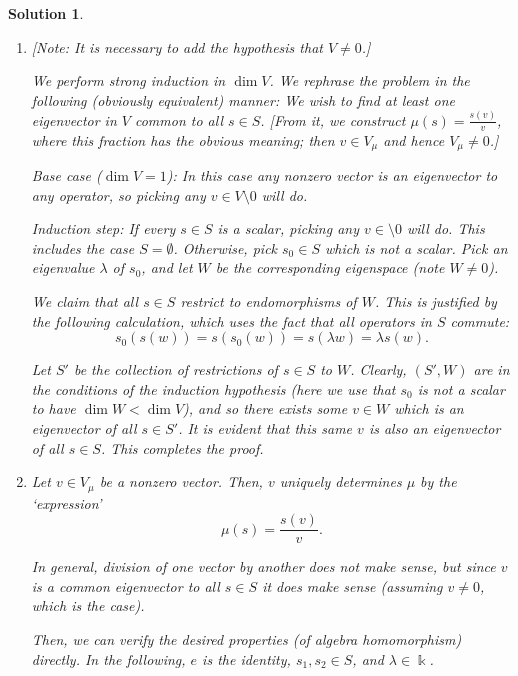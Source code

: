 \documentclass{article}
\theoremstyle{nonumberplain}
\newtheorem{sol}{Solution}
\newcommand{\kk}{\Bbbk}
\begin{document}
\begin{sol}\leavevmode
\begin{enumerate}
\item{} [Note: It is necessary to add the hypothesis that $V \neq 0$.]

We perform strong induction in $\dim V$. We rephrase the problem in the following (obviously equivalent) manner: We wish to find at least one eigenvector in $V$ common to all $s \in S$. [From it, we construct $\mu(s) = \frac{s(v)}v$, where this fraction has the obvious meaning; then $v \in V_\mu$ and hence $V_\mu \neq 0$.]

Base case ($\dim V = 1$): In this case any nonzero vector is an eigenvector to any operator, so picking any $v \in V \setminus 0$ will do.

Induction step: If every $s \in S$ is a scalar, picking any $v \in \setminus 0$ will do. This includes the case $S = \emptyset$. Otherwise, pick $s_0 \in S$ which is not a scalar. Pick an eigenvalue $\lambda$ of $s_0$, and let $W$ be the corresponding eigenspace (note $W \neq 0$).

We claim that all $s \in S$ restrict to endomorphisms of $W$. This is justified by the following calculation, which uses the fact that all operators in $S$ commute:
\begin{equation}
s_0(s(w)) = s(s_0(w)) = s(\lambda w) = \lambda s(w).
\end{equation}

Let $S'$ be the collection of restrictions of $s \in S$ to $W$. Clearly, $(S', W)$ are in the conditions of the induction hypothesis (here we use that $s_0$ is not a scalar to have $\dim W < \dim V$), and so there exists some $v \in W$ which is an eigenvector of all $s \in S'$. It is evident that this same $v$ is also an eigenvector of all $s \in S$. This completes the proof.

\item Let $v \in V_\mu$ be a nonzero vector. Then, $v$ uniquely determines $\mu$ by the `expression'
\begin{equation}
\mu(s) = \frac{s(v)}v.
\end{equation}

In general, division of one vector by another does not make sense, but since $v$ is a common eigenvector to all $s \in S$ it does make sense (assuming $v\neq0$, which is the case).

Then, we can verify the desired properties (of algebra homomorphism) directly. In the following, $e$ is the identity, $s_1, s_2 \in S$, and $\lambda \in \kk$.


\end{enumerate}
\end{sol}
\end{document}
